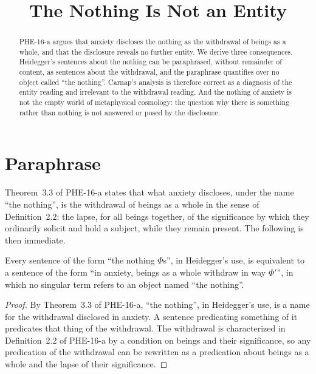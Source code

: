 \documentclass{situationist-preprint}
\title{The Nothing Is Not an Entity}
\begin{document}
\maketitle

\begin{abstract}
PHE-16-a argues that anxiety discloses the nothing as the withdrawal of beings as a whole, and that the disclosure reveals no further entity. We derive three consequences. Heidegger's sentences about the nothing can be paraphrased, without remainder of content, as sentences about the withdrawal, and the paraphrase quantifies over no object called \enquote{the nothing}. Carnap's analysis is therefore correct as a diagnosis of the entity reading and irrelevant to the withdrawal reading. And the nothing of anxiety is not the empty world of metaphysical cosmology: the question why there is something rather than nothing is not answered or posed by the disclosure.
\end{abstract}

\section{Paraphrase}

Theorem~3.3 of PHE-16-a states that what anxiety discloses, under the name \enquote{the nothing}, is the withdrawal of beings as a whole in the sense of Definition~2.2: the lapse, for all beings together, of the significance by which they ordinarily solicit and hold a subject, while they remain present. The following is then immediate.

\begin{proposition}\label{p:para}
Every sentence of the form \enquote{the nothing $\Phi$s}, in Heidegger's use, is equivalent to a sentence of the form \enquote{in anxiety, beings as a whole withdraw in way $\Phi'$}, in which no singular term refers to an object named \enquote{the nothing}.
\end{proposition}

\begin{proof}
By Theorem~3.3 of PHE-16-a, \enquote{the nothing}, in Heidegger's use, is a name for the withdrawal disclosed in anxiety. A sentence predicating something of it predicates that thing of the withdrawal. The withdrawal is characterized in Definition~2.2 of PHE-16-a by a condition on beings and their significance, so any predication of the withdrawal can be rewritten as a predication about beings as a whole and the lapse of their significance.
\end{proof}
\end{document}
